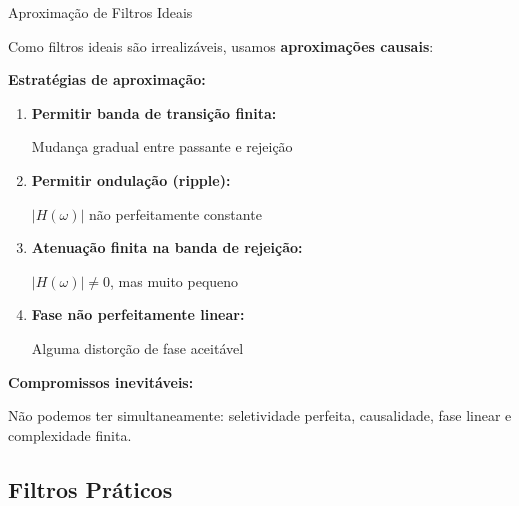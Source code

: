 \begin{frame}{Aproximação de Filtros Ideais}

Como filtros ideais são irrealizáveis, usamos \textbf{aproximações causais}:

\textbf{Estratégias de aproximação:}

\begin{enumerate}
\item \textbf{Permitir banda de transição finita:}
   
   Mudança gradual entre passante e rejeição

\item \textbf{Permitir ondulação (ripple):}
   
   $|H(\omega)|$ não perfeitamente constante

\item \textbf{Atenuação finita na banda de rejeição:}
   
   $|H(\omega)| \neq 0$, mas muito pequeno

\item \textbf{Fase não perfeitamente linear:}
   
   Alguma distorção de fase aceitável
\end{enumerate}

\vspace{0.1cm}

\textbf{Compromissos inevitáveis:}

Não podemos ter simultaneamente: seletividade perfeita, causalidade, fase linear e complexidade finita.

\end{frame}


\subsection{Filtros Práticos}

